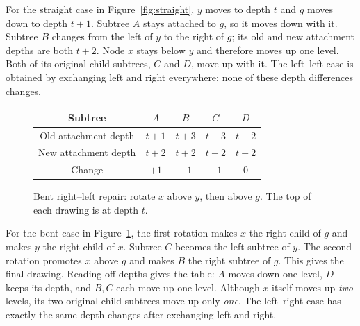 \documentclass[11pt,a4paper]{article}
\theoremstyle{readable}
\begin{document}
For the straight case in Figure~\ref{fig:straight}, $y$ moves to
depth $t$ and $g$ moves down to depth $t+1$. Subtree $A$ stays attached
to $g$, so it moves down with it. Subtree $B$ changes from the left
of $y$ to the right of $g$; its old and new attachment depths are both
$t+2$. Node $x$ stays below $y$ and therefore moves up one level.
Both of its original child subtrees, $C$ and $D$, move up with it.
The left--left case is obtained by exchanging left and right everywhere;
none of these depth differences changes.

\begin{figure}[H]
\centering
{}

\smallskip
\begin{tabular}{ccccc}
\toprule
Subtree & $A$ & $B$ & $C$ & $D$ \\
\midrule
Old attachment depth & $t+1$ & $t+3$ & $t+3$ & $t+2$ \\
New attachment depth & $t+2$ & $t+2$ & $t+2$ & $t+2$ \\
Change & $+1$ & $-1$ & $-1$ & $0$ \\
\bottomrule
\end{tabular}
\caption{Bent right--left repair: rotate $x$ above $y$, then above
$g$. The top of each drawing is at depth $t$.}
\label{fig:bent}
\end{figure}

For the bent case in Figure~\ref{fig:bent}, the first rotation makes
$x$ the right child of $g$ and makes $y$ the right child of $x$.
Subtree $C$ becomes the left subtree of $y$. The second rotation
promotes $x$ above $g$ and makes $B$ the right subtree of $g$.
This gives the final drawing. Reading off depths gives the table:
$A$ moves down one level, $D$ keeps its depth, and $B,C$ each move
up one level. Although $x$ itself moves up \emph{two} levels, its two
original child subtrees move up only \emph{one}. The left--right case
has exactly the same depth changes after exchanging left and right.
\end{document}
